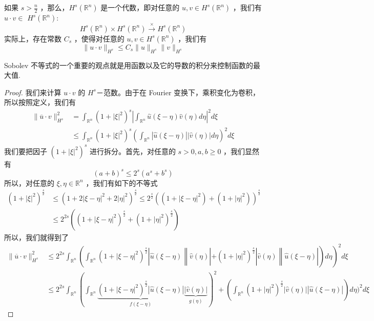 \begin{theorem}
如果 $s>\frac{n}{2}$ ，那么，$H^s\left(\mathbb{R}^n\right)$ 是一个代数，即对任意的 $u, v \in H^s\left(\mathbb{R}^n\right)$ ，我们有 $u \cdot v \in$ $H^s\left(\mathbb{R}^n\right):$
\[
H^s\left(\mathbb{R}^n\right) \times H^s\left(\mathbb{R}^n\right) \xrightarrow{\times} H^s\left(\mathbb{R}^n\right)
\]实际上，存在常数 $C_s$ ，使得对任意的 $u, v \in H^s\left(\mathbb{R}^n\right)$ ，我们有
\[
\|u \cdot v\|_{H^s} \leqslant C_s\|u\|_{H^s}\|v\|_{H^s}
\]
\end{theorem}
\begin{note}
Sobolev 不等式的⼀个重要的观点就是⽤函数以及它的导数的积分来控制函数的最⼤值.
\end{note}
\begin{proof}
我们来计算 $u \cdot v$ 的 $H^s$－范数。由于在 Fourier 变换下，乘积变化为卷积，所以按照定义，我们有
\[
\begin{aligned}
\|\overline{u} \cdot v\|_{H^s}^2 & =\int_{\mathbb{R}^n}\left(1+|\xi|^2\right)^s\left|\int_{\mathbb{R}^n} \widehat{u}(\xi-\eta) \widehat{v}(\eta) d \eta\right|^2 d \xi \\
& \leqslant \int_{\mathbb{R}^n}\left(1+|\xi|^2\right)^s\left(\int_{\mathbb{R}^n}|\widehat{u}(\xi-\eta)||\widehat{v}(\eta)| d \eta\right)^2 d \xi
\end{aligned}
\]
我们要把因子 $\left(1+|\xi|^2\right)^s$ 进行拆分。首先，对任意的 $s>0, a, b \geqslant 0$ ，我们显然有
\[
(a+b)^s \leqslant 2^s\left(a^s+b^s\right)
\]
所以，对任意的 $\xi, \eta \in \mathbb{R}^n$ ，我们有如下的不等式
\[
\begin{aligned}
\left(1+|\xi|^2\right)^{\frac{s}{2}} & \leqslant\left(1+2|\xi-\eta|^2+2|\eta|^2\right)^{\frac{s}{2}} \leqslant 2^{\frac{s}{2}}\left(\left(1+|\xi-\eta|^2\right)+\left(1+|\eta|^2\right)\right)^{\frac{s}{2}} \\
& \leqslant 2^{2 s}\left(\left(1+|\xi-\eta|^2\right)^{\frac{s}{2}}+\left(1+|\eta|^2\right)^{\frac{s}{2}}\right)
\end{aligned}
\]
所以，我们就得到了
\[
\begin{aligned}
\|\overline{u} \cdot v\|_{H^s}^2 & \left.\leqslant 2^{2 s} \int_{\mathbb{R}^n}\left(\int_{\mathbb{R}^n}\left(1+|\xi-\eta|^2\right)^{\frac{s}{2}}\left|\widehat{u}(\xi-\eta)\left\|\widehat{v}(\eta)\left|+\left(1+|\eta|^2\right)^{\frac{s}{2}}\right| \widehat{v}(\eta)\right\| \widehat{u}(\xi-\eta)\right|\right) d \eta\right)^2 d \xi \\
& \leqslant 2^{2 s} \int_{\mathbb{R}^n}(\int_{\mathbb{R}^n} \underbrace{\left(1+|\xi-\eta|^2\right)^{\frac{s}{2}}|\widehat{u}(\xi-\eta)|}_{f(\xi-\eta)} \underbrace{|\widehat{v}(\eta)|}_{g(\eta)})^2+\left(\int_{\mathbb{R}^n}\left(1+|\eta|^2\right)^{\frac{s}{2}}|\widehat{v}(\eta)||\widehat{u}(\xi-\eta)|\right) d \eta)^2 d \xi

\end{aligned}\]
\end{proof}

